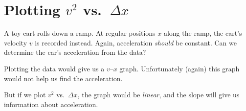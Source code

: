 \section{Plotting $v^2$ vs.\ $\Delta x$}

\begin{figure}[ht]
  \centering
\end{figure}
A toy cart rolls down a ramp. At regular positions $x$ along the ramp, the
cart's velocity $v$ is recorded instead. Again, acceleration \emph{should}
be constant. Can we determine the car's acceleration from the data?

Plotting the data would give us a $v$--$x$ graph. Unfortunately (again) this
graph would not help us find the acceleration.
\begin{figure}[ht]
  \centering
\end{figure}

But if we plot $v^2$ vs.\ $\Delta x$, the graph would be \emph{linear},
and the slope will give us information about acceleration.

\begin{figure}[ht]
  \centering
\end{figure}

